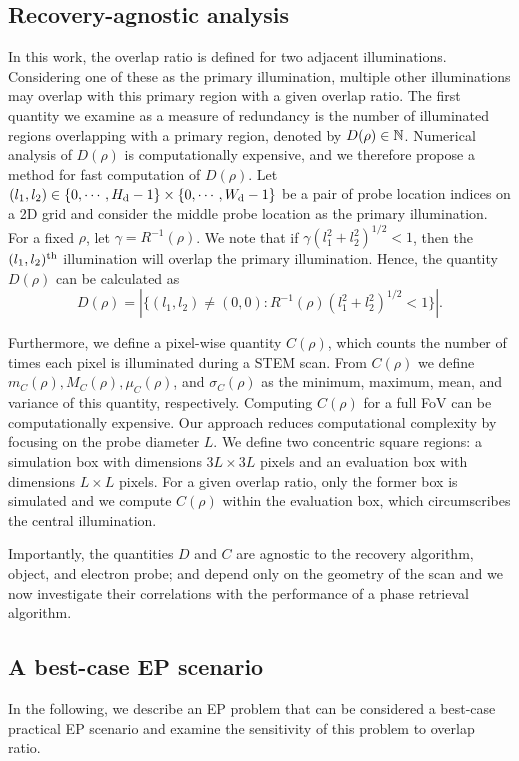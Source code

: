 \documentclass[11pt,draftclsnofoot,onecolumn]{IEEEtran}
\begin{document}
\subsection{Recovery-agnostic analysis}\label{sec:recovery-agnostic}
In this work, the overlap ratio is defined for two adjacent illuminations. Considering one of these as the primary illumination, multiple other illuminations may overlap with this primary region with a given overlap ratio. The first quantity we examine as a measure of redundancy is the number of illuminated regions overlapping with a primary region, denoted by $D(\rho) \in \mathbb N$. Numerical analysis of $D(\rho)$ is computationally expensive, and we therefore propose a method for fast computation of $D(\rho)$. Let $(l_1,l_2) \in \{0,\cdots,H_{\rm d}-1\} \times \{0,\cdots,W_{\rm d}-1\}$ be a pair of probe location indices on a 2D grid and consider the middle probe location as the primary illumination. For a fixed $\rho$, let $\gamma = R^{-1}(\rho)$. 
We note that if $\gamma (l_1^2+l_2^2)^{1/2} < 1$, then the $(l_1, l_2)^{\rm th}$ illumination will overlap  the primary illumination. Hence, the quantity $D(\rho)$ can be calculated as
\begin{equation}\label{eq:d-difinition}
    D(\rho) = |\{(l_1,l_2)\ne (0,0) : R^{-1}(\rho)(l_1^2+l_2^2)^{1/2} < 1\}|.
\end{equation}

Furthermore, we define a pixel-wise quantity $C(\rho)$, which counts the number of times each pixel is illuminated during a STEM scan.
From $C(\rho)$ we define $m_C(\rho), M_C(\rho),\mu_C(\rho)$, and $\sigma_C(\rho)$ as the minimum, maximum, mean, and variance of this quantity, respectively. Computing $C(\rho)$ for a full FoV can be computationally expensive. Our approach reduces computational complexity by focusing on the probe diameter $L$. We define two concentric square regions: a simulation box with dimensions $3L \times 3L$ pixels and an evaluation box with dimensions $L \times L$ pixels. For a given overlap ratio, only the former box is simulated and we compute $C(\rho)$ within the evaluation box, which circumscribes the central illumination.

Importantly, the quantities $D$ and $C$ are agnostic to the recovery algorithm, object, and electron probe; and depend only on the geometry of the scan and we now investigate their correlations with the performance of a phase retrieval algorithm. 

\subsection{A best-case EP scenario}\label{sec:recovery-dependant}
In the following, we describe an EP problem that can be considered a best-case practical EP scenario and examine the sensitivity of this problem to overlap ratio.
\end{document}
